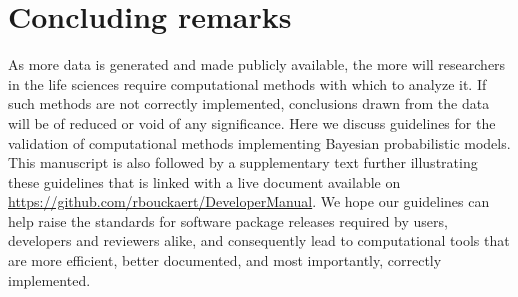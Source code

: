 \documentclass[oneside]{article}
\begin{document}



\section*{Concluding remarks}

As more data is generated and made publicly available, the more will
researchers in the life sciences require computational methods with
which to analyze it.
If such methods are not correctly implemented, conclusions drawn from
the data will be of reduced or void of any significance.
Here we discuss guidelines for the validation of computational methods
implementing Bayesian probabilistic models.
This manuscript is also followed by a supplementary text further
illustrating these guidelines that is linked with a live document
available on \href{https://github.com/rbouckaert/DeveloperManual}{https://github.com/rbouckaert/DeveloperManual}.
We hope our guidelines can help raise the standards for software
package releases required by users, developers and reviewers alike,
and consequently lead to computational tools that are more efficient,
better documented, and most importantly, correctly implemented.
\end{document}
